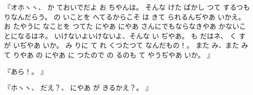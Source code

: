 『オホヽヽ、
か
ておいでだよ
お
ちやんは。
そんな
けた
ばかし
つて
するつもりなんだらう。
の
いことを
へてるからこそ
は
きて
られるんぢやあ
いかえ。
お
たやうに
なことを
つてた
にやあ
にやあ
さんにでもならなきやあ
かないことになるはネ。
いけないよいけないよ、そんな
い
ぢやあ。
も
だはネ、
く
すが
いぢやあ
いか。
み
りに
て
れ
くつたつて
なんだもの！。
また
み、また
み
て
りやあ
の
にやあ
に
つたので
の
るのも
て
やうぢやあ
いか。
』

『あら！。
』

『ホヽヽ、
だえ？、
にやあ
が
きるかえ？。
』

